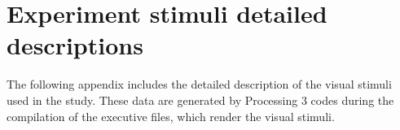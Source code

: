 \chapter{Experiment stimuli detailed descriptions}
\label{app:stimulidescription}
The following appendix includes the detailed description of the visual stimuli used in the study. These data are generated by Processing 3 codes during the compilation of the executive files, which render the visual stimuli.
